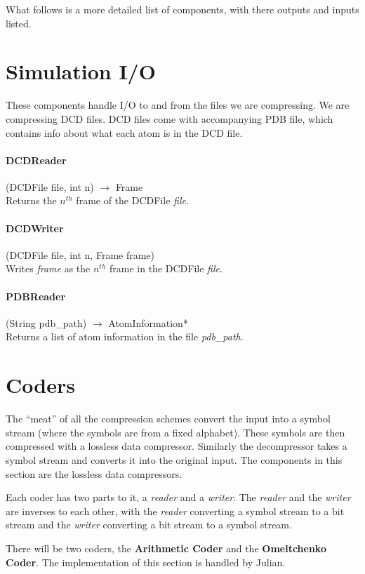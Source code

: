 \documentclass{report}
\begin{document}
What follows is a more detailed list of components, with there outputs and
inputs listed.

\section{Simulation I/O}

These components handle I/O to and from the files we are compressing. We are
compressing DCD files. DCD files come with accompanying PDB file, which
contains info about what each atom is in the DCD file.

\paragraph{DCDReader} (DCDFile file, int n) $\to$ Frame \\
Returns the $n^{th}$ frame of the DCDFile \emph{file}.

\paragraph{DCDWriter} (DCDFile file, int n, Frame frame) \\
Writes \emph{frame} as the $n^{th}$ frame in the DCDFile \emph{file}.

\paragraph{PDBReader} (String pdb\_path) $\to$ AtomInformation* \\
Returns a list of atom information in the file \emph{pdb\_path}.


\section{Coders}

The ``meat'' of all the compression schemes convert the input into a symbol
stream (where the symbols are from a fixed alphabet). These symbols are then
compressed with a lossless data compressor. Similarly the decompressor takes a
symbol stream and converts it into the original input. The components in this
section are the lossless data compressors.

Each coder has two parts to it, a \emph{reader} and a \emph{writer}. The
\emph{reader} and the \emph{writer} are inverses to each other, with the
\emph{reader} converting a symbol stream to a bit stream and the \emph{writer}
converting a bit stream to a symbol stream.

There will be two coders, the \textbf{Arithmetic Coder} and the
\textbf{Omeltchenko Coder}. The implementation of this section is handled by
Julian.



\nocite{*}

\end{document}
